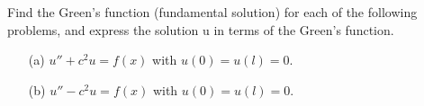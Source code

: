 \documentclass[12pt]{report}
\begin{document}
\newpage



\begin{problem}
    Find the Green's function (fundamental solution) for each of the following problems, and express the solution u in terms of the Green's function.
    \begin{enumerate}
        \item [(a)] $u'' + c^2 u = f(x)$ with $u(0) = u(l) = 0$.
        \item [(b)] $u'' - c^2 u = f(x)$ with $u(0) = u(l) = 0$.
    \end{enumerate}
\end{problem}
\end{document}
